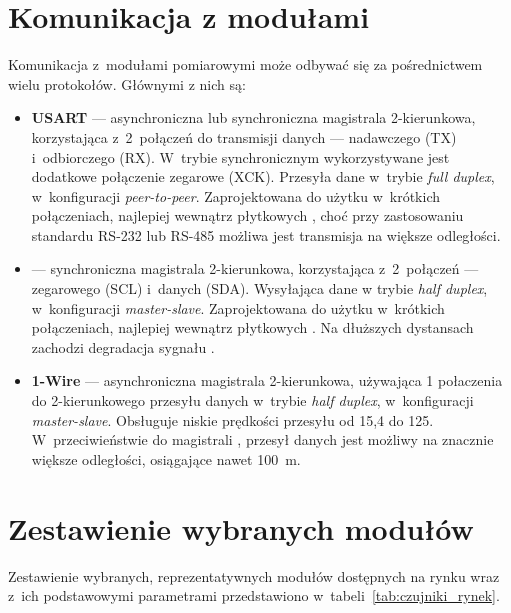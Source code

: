 \section{Komunikacja z modułami}
Komunikacja z~modułami pomiarowymi może odbywać się 
za pośrednictwem wielu protokołów. Głównymi z nich
są: 
\begin{itemize}
    \item \textbf{USART} --- asynchroniczna lub synchroniczna magistrala
    2-kierunkowa, korzystająca z~2~połączeń do transmisji danych ---
    nadawczego (TX) i~odbiorczego (RX). W~trybie synchronicznym
    wykorzystywane jest dodatkowe połączenie zegarowe (XCK).
    Przesyła dane w~trybie \textit{full duplex}, w~konfiguracji
    \textit{peer-to-peer}.
    Zaprojektowana do użytku w~krótkich połączeniach,
    najlepiej wewnątrz płytkowych ,
    choć przy zastosowaniu standardu RS-232 lub RS-485 możliwa
    jest transmisja na większe odległości.
    
    \item \textbf{\isqrc} --- synchroniczna magistrala
    2-kierunkowa, korzystająca z~2~połączeń --- 
    zegarowego (SCL) i~danych (SDA). 
    Wysyłająca dane w trybie \textit{half duplex}, w~konfiguracji
    \textit{master-slave}.
    Zaprojektowana do użytku w~krótkich połączeniach, najlepiej 
    wewnątrz płytkowych \cite{I2C_Bus_Electrical_Specifications}. 
    Na dłuższych dystansach zachodzi degradacja sygnału 
    .

    \item \textbf{1-Wire} --- asynchroniczna magistrala 2-kierunkowa,
    używająca 1 połaczenia do 2-kierunkowego przesyłu danych w~trybie
    \textit{half duplex}, w~konfiguracji \textit{master-slave}. 
    Obsługuje niskie prędkości przesyłu 
    od 15,4 do \SI{125}{\kilobitpersecond}.
    W~przeciwieństwie do magistrali \isqrc, przesył danych jest 
    możliwy na znacznie większe odległości, osiągające nawet 
    \SI{100}{\meter}\cite{1-Wire_Bus}.
\end{itemize}

\section{Zestawienie wybranych modułów}
Zestawienie wybranych, reprezentatywnych modułów dostępnych na rynku 
wraz z~ich podstawowymi parametrami przedstawiono 
w~tabeli~\ref{tab:czujniki_rynek}.

